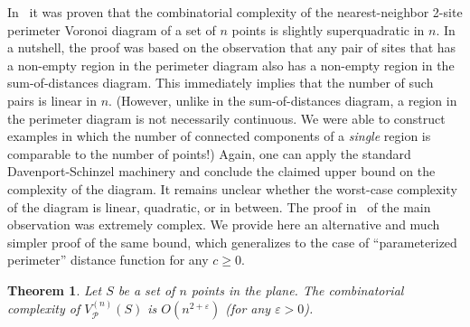 \documentclass[10pt, conference, compsocconf]{IEEEtran}
\newtheorem{theorem}{Theorem}
\def\PP{{\mathcal P}}
\newcommand{\eps}{\varepsilon}
\begin{document}
In~\cite{HB09} it was proven that the combinatorial complexity of the
nearest-neighbor 2-site perimeter Voronoi diagram of a set of $n$ points is slightly
superquadratic in $n$.  In a nutshell, the proof was based
on the observation that any pair of sites that has a non-empty region in
the perimeter diagram also has a non-empty region in the sum-of-distances
diagram.  This immediately implies that the number of such pairs is
linear in $n$.  (However, unlike in the sum-of-distances
diagram, a region in the perimeter diagram is not necessarily continuous.
We were able to construct examples in which the number of connected
components of a \emph{single} region is comparable to the number of points!)
Again, one can apply the standard Davenport-Schinzel machinery and
conclude the claimed upper bound on the complexity of the diagram.
It remains unclear whether the worst-case complexity of the diagram is
linear, quadratic, or in between.
The proof in~\cite{HB09} of the main observation was extremely complex.
We provide here an alternative and much simpler proof of the same bound,
which generalizes to the case of ``parameterized perimeter'' distance
function for any $c \geq 0$.

\begin{theorem}
   \label{TH-ub-per}
   Let $S$ be a set of $n$ points in the plane.
   The combinatorial complexity of $V_\PP^{(n)}(S)$ is $O(n^{2+\eps})$
   (for any $\eps > 0$).
\end{theorem}
\end{document}
